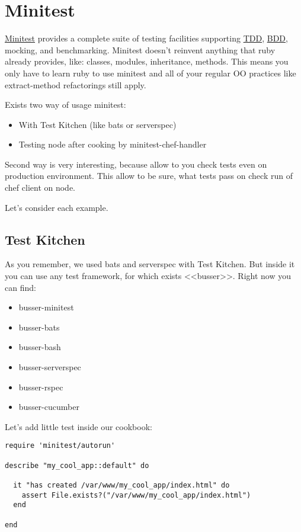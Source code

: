 \section{Minitest}
\label{sec:testing-minitest}

\href{https://github.com/seattlerb/minitest}{Minitest} provides a complete suite of testing facilities supporting \href{http://en.wikipedia.org/wiki/Test-driven\_development}{TDD}, \href{http://en.wikipedia.org/wiki/Behavior-driven\_development}{BDD}, mocking, and benchmarking. Minitest doesn't reinvent anything that ruby already provides, like: classes, modules, inheritance, methods. This means you only have to learn ruby to use minitest and all of your regular OO practices like extract-method refactorings still apply.

Exists two way of usage minitest:

\begin{itemize}
  \item With Test Kitchen (like bats or serverspec)
  \item Testing node after cooking by minitest-chef-handler
\end{itemize}

Second way is very interesting, because allow to you check tests even on production environment. This allow to be sure, what tests pass on check run of chef client on node.

Let's consider each example.

\subsection{Test Kitchen}

As you remember, we used bats and serverspec with Test Kitchen. But inside it you can use any test framework, for which exists <<busser>>. Right now you can find:

\begin{itemize}
  \item busser-minitest
  \item busser-bats
  \item busser-bash
  \item busser-serverspec
  \item busser-rspec
  \item busser-cucumber
\end{itemize}

Let's add little test inside our cookbook:

\begin{lstlisting}[label=lst:testing-minitest1]
require 'minitest/autorun'

describe "my_cool_app::default" do

  it "has created /var/www/my_cool_app/index.html" do
    assert File.exists?("/var/www/my_cool_app/index.html")
  end

end
\end{lstlisting}

